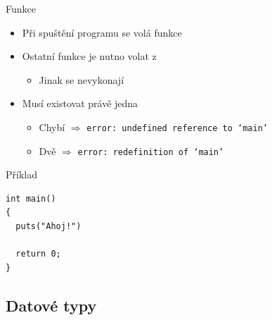 \begin{frame}[fragile]{Funkce }

  \begin{itemize}
    \item Při spuštění programu se volá funkce 

    \pause

    \item Ostatní funkce je nutno volat z 
    \begin{itemize}
      \item Jinak se nevykonají
    \end{itemize}

    \pause

    \item Musí existovat právě jedna
    \begin{itemize}
      \item Chybí $\Rightarrow$ \texttt{error: undefined reference to `main'}
      \item Dvě $\Rightarrow$ \texttt{error: redefinition of ‘main’}
    \end{itemize}
  \end{itemize}


  \begin{block}{Příklad}
  \begin{lstlisting}
int main()
{
  puts("Ahoj!")

  return 0;
}
  \end{lstlisting}
  \end{block}

\end{frame}

\subsection*{Datové typy}
\frame{\subsectionpage}

